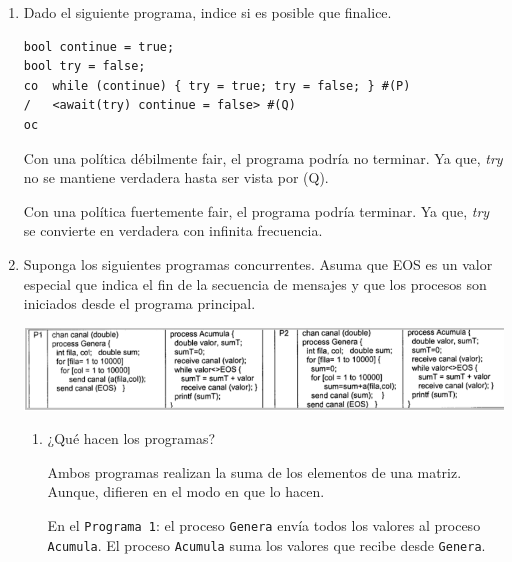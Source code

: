 \documentclass[a4paper, 10pt]{article}
\newenvironment{QandA}{
    \begin{enumerate}\bfseries}
    {\end{enumerate}
}
\newenvironment{answered}{\par\normalfont}{}
\begin{document}
\begin{QandA}
\begin{enumerate}
\begin{answered}
Tiempo P$_{resto}= 297216 \times 1 ut + 294912 \times 2 ut + 294912 \times 3 = 1771776 ut$

Con estos nuevos tiempos el speedup será de 7,1.
\end{answered}
\end{enumerate}

\item Dado el siguiente programa, indice si es posible que finalice.

\begin{lstlisting}
bool continue = true;
bool try = false;
co  while (continue) { try = true; try = false; } #(P)
/   <await(try) continue = false> #(Q)
oc
\end{lstlisting}

\begin{answered}
Con una política débilmente fair, el programa podría no terminar. Ya que, \emph{try} no se mantiene verdadera hasta ser vista por (Q).

Con una política fuertemente fair, el programa podría terminar. Ya que, \emph{try} se convierte en verdadera con infinita frecuencia.
\end{answered}

\item Suponga los siguientes programas concurrentes. Asuma que EOS es un valor especial que indica el fin de la secuencia de mensajes y que los procesos son iniciados desde el programa principal.

\includegraphics[]{assets/ejercicio-22.png}

\begin{enumerate}
\item ¿Qué hacen los programas?

\begin{answered}
Ambos programas realizan la suma de los elementos de una matriz. Aunque, difieren en el modo en que lo hacen.

En el \lstinline{Programa 1}: el proceso \lstinline{Genera} envía todos los valores al proceso \lstinline{Acumula}. El proceso \lstinline{Acumula} suma los valores que recibe desde \lstinline{Genera}.


\end{answered}
\end{enumerate}
\end{QandA}
\end{document}
